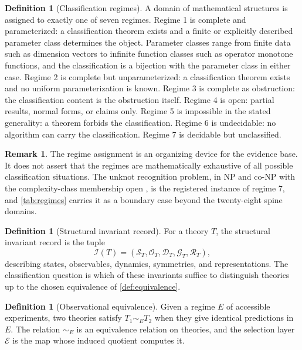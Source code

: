 \documentclass[11pt,letterpaper]{article}
\theoremstyle{definition}
\newtheorem{definition}[theorem]{Definition}
\newtheorem{remark}[theorem]{Remark}
\begin{document}
\begin{definition}[Classification regimes]
\label{def:regimes}
A domain of mathematical structures is assigned to exactly one of seven regimes. Regime 1 is complete and parameterized: a classification theorem exists and a finite or explicitly described parameter class determines the object. Parameter classes range from finite data such as dimension vectors to infinite function classes such as operator monotone functions, and the classification is a bijection with the parameter class in either case. Regime 2 is complete but unparameterized: a classification theorem exists and no uniform parameterization is known. Regime 3 is complete as obstruction: the classification content is the obstruction itself. Regime 4 is open: partial results, normal forms, or claims only. Regime 5 is impossible in the stated generality: a theorem forbids the classification. Regime 6 is undecidable: no algorithm can carry the classification. Regime 7 is decidable but unclassified.
\end{definition}

\begin{remark}
The regime assignment is an organizing device for the evidence base. It does not assert that the regimes are mathematically exhaustive of all possible classification situations. The unknot recognition problem, in $\mathrm{NP}$ and co-$\mathrm{NP}$ with the complexity-class membership open \cite{corpus-61}, is the registered instance of regime 7, and \cref{tab:regimes} carries it as a boundary case beyond the twenty-eight spine domains.
\end{remark}

\begin{definition}[Structural invariant record]
\label{def:invariants}
For a theory $T$, the structural invariant record is the tuple
\[
  \mathcal{I}(T) = (\mathcal{S}_T, \mathcal{O}_T, \mathcal{D}_T, \mathcal{G}_T, \mathcal{R}_T),
\]
describing states, observables, dynamics, symmetries, and representations. The classification question is which of these invariants suffice to distinguish theories up to the chosen equivalence of \cref{def:equivalence}.
\end{definition}

\begin{definition}[Observational equivalence]
\label{def:observational}
Given a regime $E$ of accessible experiments, two theories satisfy $T_1 \sim_E T_2$ when they give identical predictions in $E$. The relation $\sim_E$ is an equivalence relation on theories, and the selection layer $\mathcal{E}$ is the map whose induced quotient computes it.
\end{definition}
\end{document}

